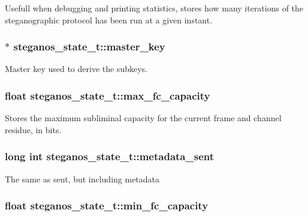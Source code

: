 Usefull when debugging and printing statistics, stores how many iterations of the steganographic protocol has been run at a given instant. \hypertarget{structsteganos__state__t_aa0d2cbc935164c4627d9960c97c2e466}{
\subsubsection[{master\_\-key}]{$\ast$ {\bf steganos\_\-state\_\-t::master\_\-key}}}
\label{structsteganos__state__t_aa0d2cbc935164c4627d9960c97c2e466}
Master key used to derive the subkeys. \hypertarget{structsteganos__state__t_a5c33ee391f0074f8df354314ffd65c96}{
\subsubsection[{max\_\-fc\_\-capacity}]{\setlength{\rightskip}{0pt plus 5cm}float {\bf steganos\_\-state\_\-t::max\_\-fc\_\-capacity}}}
\label{structsteganos__state__t_a5c33ee391f0074f8df354314ffd65c96}
Stores the maximum subliminal capacity for the current frame and channel residue, in bits. \hypertarget{structsteganos__state__t_a2e6797670afeb03e81514e1b8e5b53b7}{
\subsubsection[{metadata\_\-sent}]{\setlength{\rightskip}{0pt plus 5cm}long int {\bf steganos\_\-state\_\-t::metadata\_\-sent}}}
\label{structsteganos__state__t_a2e6797670afeb03e81514e1b8e5b53b7}
The same as sent, but including metadata \hypertarget{structsteganos__state__t_a30506b9be18bd2a58856d6ba5a3fd15f}{
\subsubsection[{min\_\-fc\_\-capacity}]{\setlength{\rightskip}{0pt plus 5cm}float {\bf steganos\_\-state\_\-t::min\_\-fc\_\-capacity}}}
